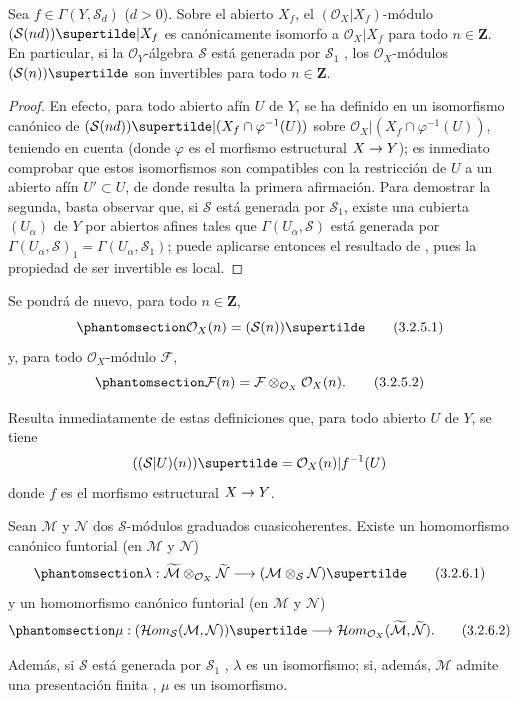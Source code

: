 \documentclass[oneside,10pt]{amsart}
\makeatletter
\newcommand{\ega@arrow}[2]{\mathchoice{#1}{#2}{#2}{#2}}
\renewcommand{\to}{\ega@arrow{\longrightarrow}{\rightarrow}}
\let\EGAOriginalLabel\label
\renewcommand{\label}[1]{\phantomsection\EGAOriginalLabel{#1}}
\makeatother
\begin{document}
\begin{proposition}[3.2.5]
\label{II.3.2.5-fr}
Sea $f\in\Gamma(Y,\mathcal{S}_d)$ ($d>0$).
Sobre el abierto $X_f$, el $(\mathcal{O}_X|X_f)$-módulo $(\mathcal{S}(nd))\supertilde|X_f$ es canónicamente isomorfo a $\mathcal{O}_X|X_f$ para todo $n\in\mathbf{Z}$.
En particular, si la $\mathcal{O}_Y$-álgebra $\mathcal{S}$ está generada por $\mathcal{S}_1$ , los $\mathcal{O}_X$-módulos $(\mathcal{S}(n))\supertilde$ son invertibles para todo $n\in\mathbf{Z}$.
\end{proposition}

\begin{proof}
En efecto, para todo abierto afín $U$ de $Y$, se ha definido en  un isomorfismo canónico de $(\mathcal{S}(nd))\supertilde|(X_f\cap\varphi^{-1}(U))$ sobre $\mathcal{O}_X|(X_f\cap\varphi^{-1}(U))$, teniendo en cuenta  (donde $\varphi$ es el morfismo estructural $X\to Y$); es inmediato comprobar que estos isomorfismos son compatibles con la restricción de $U$ a un abierto afín $U'\subset U$, de donde resulta la primera afirmación.
Para demostrar la segunda, basta observar que, si $\mathcal{S}$ está generada por $\mathcal{S}_1$, existe una cubierta $(U_\alpha)$ de $Y$ por abiertos afines tales que $\Gamma(U_\alpha,\mathcal{S})$ está generada por $\Gamma(U_\alpha,\mathcal{S})_1=\Gamma(U_\alpha,\mathcal{S}_1)$; puede aplicarse entonces el resultado de , pues la propiedad de ser invertible es local.
\end{proof}

Se pondrá de nuevo, para todo $n\in\mathbf{Z}$,
\[
\label{II.3.2.5.1-fr}
  \mathcal{O}_X(n)=(\mathcal{S}(n))\supertilde
\tag{3.2.5.1}
\]
y, para todo $\mathcal{O}_X$-módulo $\mathcal{F}$,
\[
\label{II.3.2.5.2-fr}
  \mathcal{F}(n)=\mathcal{F}\otimes_{\mathcal{O}_X}\mathcal{O}_X(n).
\tag{3.2.5.2}
\]

Resulta inmediatamente de estas definiciones que, para todo abierto $U$ de $Y$, se tiene
\[
  ((\mathcal{S}|U)(n))\supertilde
  =\mathcal{O}_X(n)|f^{-1}(U)
\]
donde $f$ es el morfismo estructural $X\to Y$.

\begin{proposition}[3.2.6]
\label{II.3.2.6-fr}
Sean $\mathcal{M}$ y $\mathcal{N}$ dos $\mathcal{S}$-módulos graduados cuasicoherentes.
Existe un homomorfismo canónico funtorial (en $\mathcal{M}$ y $\mathcal{N}$)
\[
\label{II.3.2.6.1-fr}
  \lambda:\widetilde{\mathcal{M}}
  \otimes_{\mathcal{O}_X}\widetilde{\mathcal{N}}
  \longrightarrow(\mathcal{M}\otimes_{\mathcal{S}}\mathcal{N})\supertilde
\tag{3.2.6.1}
\]
y un homomorfismo canónico funtorial (en $\mathcal{M}$ y $\mathcal{N}$)
\[
\label{II.3.2.6.2-fr}
  \mu:(\mathcal{H}om_{\mathcal{S}}(\mathcal{M},\mathcal{N}))\supertilde
  \longrightarrow
  \mathcal{H}om_{\mathcal{O}_X}
  (\widetilde{\mathcal{M}},\widetilde{\mathcal{N}}).
\tag{3.2.6.2}
\]

Además, si $\mathcal{S}$ está generada por $\mathcal{S}_1$ , $\lambda$ es un isomorfismo; si, además, $\mathcal{M}$ admite una presentación finita , $\mu$ es un isomorfismo.
\end{proposition}
\end{document}
